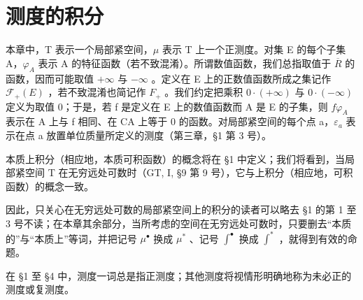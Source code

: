 \chapter{测度的积分}

本章中，T 表示一个局部紧空间，\(\mu\) 表示 T 上一个正测度。对集 E 的每个子集 A，\(\varphi_{A}\) 表示 A 的特征函数（若不致混淆）。所谓数值函数，我们总指取值于 \(\overline{R}\) 的函数，因而可能取值 \(+\infty\) 与 \(-\infty\) 。定义在 E 上的正数值函数所成之集记作 \(\mathcal{F}_{+}(E)\) ，若不致混淆也简记作 \(F_{+}\) 。我们约定把乘积 \(0 \cdot (+\infty)\) 与 \(0 \cdot (-\infty)\) 定义为取值 0；于是，若 f 是定义在 E 上的数值函数而 A 是 E 的子集，则 \(f\varphi_{A}\) 表示在 A 上与 f 相同、在 CA 上等于 0 的函数。对局部紧空间的每个点 a，\(\varepsilon_{a}\) 表示在点 a 放置单位质量所定义的测度（第三章，§1 第 3 号）。

本质上积分（相应地，本质可积函数）的概念将在 §1 中定义；我们将看到，当局部紧空间 T 在无穷远处可数时（GT, I, §9 第 9 号），它与上积分（相应地，可积函数）的概念一致。

因此，只关心在无穷远处可数的局部紧空间上的积分的读者可以略去 §1 的第 1 至 3 号不读；在本章其余部分，当所考虑的空间在无穷远处可数时，只要删去“本质的”与“本质上”等词，并把记号 \(\mu^{\bullet}\) 换成 \(\mu^{*}\) 、记号 \(\int^{\bullet}\) 换成 \(\int^{*}\) ，就得到有效的命题。

在 §1 至 §4 中，测度一词总是指正测度；其他测度将视情形明确地称为未必正的测度或复测度。

